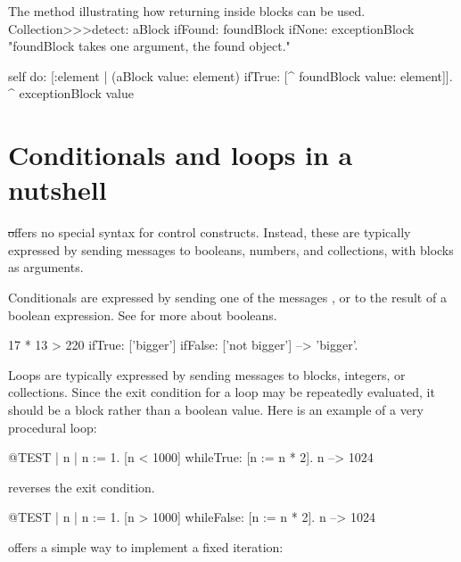 \documentclass[a4paper,10pt,twoside]{book}
\begin{document}
\begin{method}[detectReturnBlock]{The method  illustrating how returning inside blocks can be used.}
Collection>>>detect: aBlock ifFound: foundBlock ifNone: exceptionBlock 
   "foundBlock takes one argument, the found object."

   self do: [:element | 
      (aBlock value: element) ifTrue: [^ foundBlock value: element]].
   ^ exceptionBlock value
\end{method}


\section{Conditionals and loops in a nutshell}

\st offers no special syntax for control constructs.
Instead, these are typically expressed by sending messages to booleans, numbers, and collections, with blocks as arguments.

Conditionals are expressed by sending one of the messages ,  or  to the result of a boolean expression.
See  for more about booleans.

\begin{code}{}
17 * 13 > 220
   ifTrue: ['bigger']
   ifFalse: ['not bigger'] --> 'bigger'.
\end{code}

Loops are typically expressed by sending messages to blocks, integers, or collections.
Since the exit condition for a loop may be repeatedly evaluated, it should be a block rather than a boolean value.
Here is an example of a very procedural loop:

\begin{code}{@TEST | n |}
n := 1.
[n < 1000] whileTrue: [n := n * 2].
n --> 1024
\end{code}

\noindent
{} reverses the exit condition.
\begin{code}{@TEST | n |}
n := 1.
[n > 1000] whileFalse: [n := n * 2].
n --> 1024
\end{code}

\noindent
{} offers a simple way to implement a fixed iteration:
\end{document}
